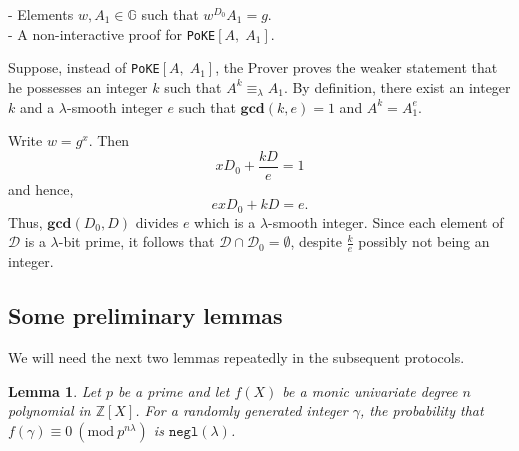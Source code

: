 \documentclass[11pt, lettersize, notitlepage, leqno, footskip=0.6cm]{article}
\newcommand{\bz}{\mathbb Z}
\newcommand{\ttt}{\texttt}
\newcommand{\eqlam}{\equiv_{\lam}}
\newcommand{\mc}{\mathcal}
\newcommand{\mb}{\mathbb}
\newcommand{\mbf}{\mathbf}
\newcommand{\lam}{\lambda}
\newcommand{\vs}{\vspace{-0.15cm}}
\newcommand{\noin}{\noindent}
\newcommand{\Mod}[1]{\ (\mathrm{mod}\ #1)}
\newcommand{\GCD}{\mbf{gcd}}
\newtheorem{Lem}[Thm]{Lemma}
\numberwithin{equation}{section}
\begin{document}
\noin - Elements $w, A_1\in\mb{G}$ such that $w^{D_0}A_1 = g$.\\
- A non-interactive proof for \verb|PoKE|$[A,\; A_1]$.

Suppose, instead of \verb|PoKE|$[A,\; A_1]$, the Prover proves the weaker statement that he possesses an integer $k$ such that $A^k \eqlam A_1$. By definition, there exist an integer $k$ and a $\lam$-smooth integer $e$ such that $\GCD(k,e) = 1$ and $A^{k} = A_1^e$.

Write $w = g^x$. Then \vs $$ x D_0 +  
\frac{kD}{e} = 1 $$ and hence, \vs $$ex D_0 +  kD = e .$$ Thus, $\GCD(D_0, D)$ divides $e$ which is a $\lam$-smooth integer. Since each element of $\mc{D}$ is a $\lam$-bit prime, it follows that $\mc{D}\cap \mc{D}_0 = \emptyset$, despite $\frac{k}{e}$ possibly not being an integer.

\subsection{\fontsize{11}{11}\selectfont Some preliminary lemmas }

\noin We will need the next two lemmas repeatedly in the subsequent protocols.

\begin{Lem} Let $p$ be a prime and let $f(X)$ be a monic univariate degree $n$ polynomial in $\bz[X]$. For a randomly generated integer $\gamma$, the probability that $f(\gamma)\equiv 0\Mod{p^{n\lam}}$ is \normalfont $\ttt{negl}(\lam)$. \end{Lem}
\end{document}
